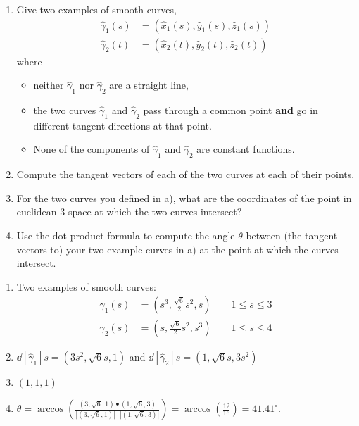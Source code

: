 \documentclass[newpage,hints,handout,nooutcomes,noauthor,12pt]{ximera}
\begin{document}
\begin{problem}\hfil
\begin{enumerate}
\label{1}\item Give two examples of smooth curves,
\begin{align*}
\hat{\gamma}_{1}(s) &=\left(\hat{x}_{1}(s),\hat{y}_{1}(s),\hat{z}_{1}(s)\right) \\
\hat{\gamma}_{2}(t) &=\left(\hat{x}_{2}(t),\hat{y}_{2}(t),\hat{z}_{2}(t)\right)
\end{align*}
where
\begin{itemize}
\item neither $\hat{\gamma}_1$ nor $\hat{\gamma}_2$ are a straight line,
\item the two curves $\hat{\gamma}_1$ and $\hat{\gamma}_2$ pass through a common
  point \textbf{and} go in different tangent directions at that point.
\item None of the components of $\hat{\gamma}_1$ and $\hat{\gamma}_2$ are
  constant functions.
\end{itemize}

\item Compute the tangent vectors of each of the two curves at each of their
  points.

\item For the two curves you defined in a), what are the coordinates of the
  point in euclidean $3$-space at which the two curves intersect?

\item Use the dot product formula to compute the angle $\theta$ between (the
tangent vectors to) your two example curves in a) at the point at which the
curves intersect. %
\end{enumerate}


\begin{freeResponse} 
\begin{enumerate}
\label{1}\item Two examples of smooth curves:
\begin{align*}
\hat{\gamma}_{1}(s) &=\left(s^3, \frac{\sqrt{6}}{2}s^2, s\right) \qquad 1 \leq s\leq3 \\
\hat{\gamma}_{2}(s) &=\left(s, \frac{\sqrt{6}}{2}s^2, s^3\right) \qquad 1 \leq s\leq4
\end{align*}

\item  $\dd[\hat{\gamma}_{1}]{s} = \left(3s^2, \sqrt{6}s, 1 \right)$ and 
$\dd[\hat{\gamma}_{2}]{s} =  \left(1, \sqrt{6}s,  3s^2 \right)$

\item $\left(1,1,1 \right)$

\item 
$\theta = \arccos \left( 
   \frac{ \left(3, \sqrt{6} , 1 \right) \bullet \left(1, \sqrt{6} , 3 \right)}
   { |\left(3, \sqrt{6} , 1 \right)| \cdot |\left(1, \sqrt{6} , 3 \right)|} \right)
= \arccos \left( \frac{12}{16} \right) = 41.41^{\circ}.$

\end{enumerate}
\end{freeResponse}

\end{problem}
\end{document}
